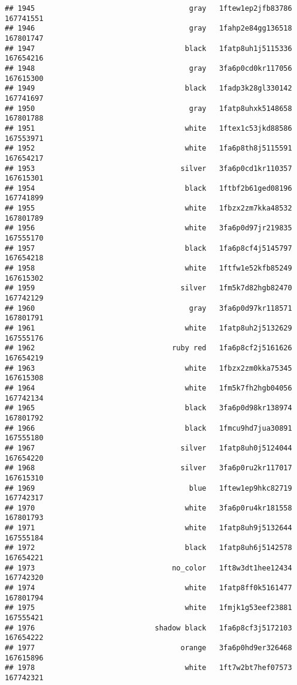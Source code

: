 \documentclass[
]{article}
\begin{document}
\begin{verbatim}
## 1945                                    gray   1ftew1ep2jfb83786 167741551
## 1946                                    gray   1fahp2e84gg136518 167801747
## 1947                                   black   1fatp8uh1j5115336 167654216
## 1948                                    gray   3fa6p0cd0kr117056 167615300
## 1949                                   black   1fadp3k28gl330142 167741697
## 1950                                    gray   1fatp8uhxk5148658 167801788
## 1951                                   white   1ftex1c53jkd88586 167553971
## 1952                                   white   1fa6p8th8j5115591 167654217
## 1953                                  silver   3fa6p0cd1kr110357 167615301
## 1954                                   black   1ftbf2b61ged08196 167741899
## 1955                                   white   1fbzx2zm7kka48532 167801789
## 1956                                   white   3fa6p0d97jr219835 167555170
## 1957                                   black   1fa6p8cf4j5145797 167654218
## 1958                                   white   1ftfw1e52kfb85249 167615302
## 1959                                  silver   1fm5k7d82hgb82470 167742129
## 1960                                    gray   3fa6p0d97kr118571 167801791
## 1961                                   white   1fatp8uh2j5132629 167555176
## 1962                                ruby red   1fa6p8cf2j5161626 167654219
## 1963                                   white   1fbzx2zm0kka75345 167615308
## 1964                                   white   1fm5k7fh2hgb04056 167742134
## 1965                                   black   3fa6p0d98kr138974 167801792
## 1966                                   black   1fmcu9hd7jua30891 167555180
## 1967                                  silver   1fatp8uh0j5124044 167654220
## 1968                                  silver   3fa6p0ru2kr117017 167615310
## 1969                                    blue   1ftew1ep9hkc82719 167742317
## 1970                                   white   3fa6p0ru4kr181558 167801793
## 1971                                   white   1fatp8uh9j5132644 167555184
## 1972                                   black   1fatp8uh6j5142578 167654221
## 1973                                no_color   1ft8w3dt1hee12434 167742320
## 1974                                   white   1fatp8ff0k5161477 167801794
## 1975                                   white   1fmjk1g53eef23881 167555421
## 1976                            shadow black   1fa6p8cf3j5172103 167654222
## 1977                                  orange   3fa6p0hd9er326468 167615896
## 1978                                   white   1ft7w2bt7hef07573 167742321

\end{verbatim}
\end{document}
